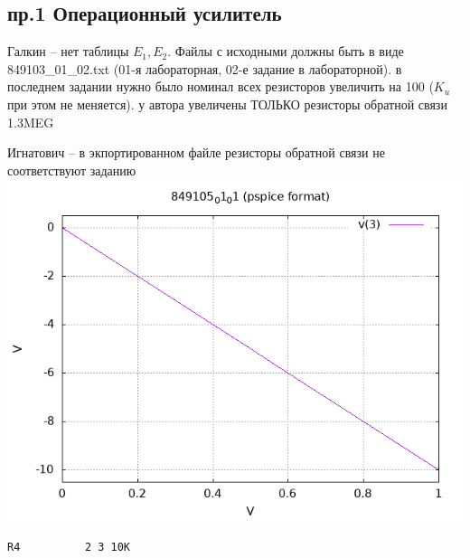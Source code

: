 \documentclass[a4paper,landscape,11pt]{article}
\begin{document}
\subsection*{пр.1 Операционный усилитель}
Галкин -- нет таблицы $E_1,E_2$. Файлы с исходными должны быть в виде 849103\_01\_02.txt (01-я лабораторная, 02-е задание в лабораторной).
в последнем задании нужно было номинал всех  резисторов увеличить на 100 ($K_u$ при этом не меняется). у автора увеличены ТОЛЬКО резисторы обратной связи  1.3MEG

Игнатович -- в экпортированном файле резисторы обратной связи не соответствуют заданию
\includegraphics[scale=0.2]{"849105_01_01"}
\begin{verbatim}
R4          2 3 10K
\end{verbatim}
\end{document}
